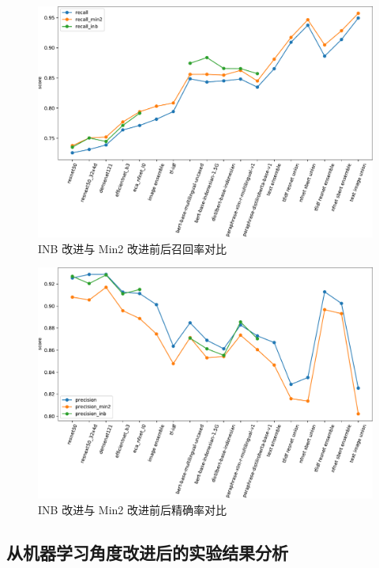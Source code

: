 \documentclass[12pt]{article}
\begin{document}
\begin{figure}[htbp]
  \centering
  \includegraphics[width=14cm]{results_plot_recall_df.pdf}
  \caption{INB 改进与 Min2 改进前后召回率对比}
  \label{fig:results_summary_recall_analysis}
\end{figure}

\begin{figure}[htbp]
  \centering
  \includegraphics[width=14cm]{results_plot_precision_df.pdf}
  \caption{INB 改进与 Min2 改进前后精确率对比}
  \label{fig:results_summary_precision_analysis}
\end{figure}

\subsection{从机器学习角度改进后的实验结果分析}
\end{document}
